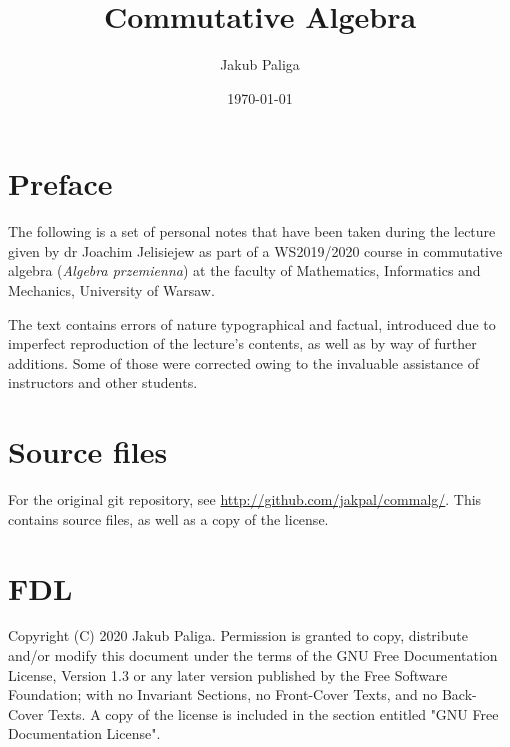 \author{Jakub Paliga}
\subject{Lecture notes for}
\title{Commutative Algebra}
\date{\today}

\maketitle

\section{Preface}
The following is a set of personal notes that have been taken during the lecture given by dr Joachim Jelisiejew as part of a WS2019/2020 course in commutative algebra (\textit{Algebra przemienna}) at the faculty of Mathematics, Informatics and Mechanics, University of Warsaw.

The text contains errors of nature typographical and factual, introduced due to imperfect reproduction of the lecture's contents, as well as by way of further additions. Some of those were corrected owing to the invaluable assistance of instructors and other students.

\section{Source files}
For the original git repository, see \url{http://github.com/jakpal/commalg/}. This contains source files, as well as a copy of the license.

\section{FDL}
Copyright (C)  2020  Jakub Paliga.
Permission is granted to copy, distribute and/or modify this document
under the terms of the GNU Free Documentation License, Version 1.3
or any later version published by the Free Software Foundation;
with no Invariant Sections, no Front-Cover Texts, and no Back-Cover Texts.
A copy of the license is included in the section entitled "GNU
Free Documentation License".
    


